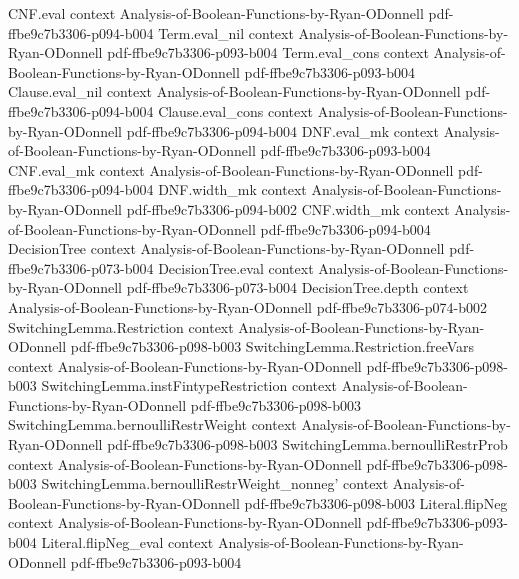 \begin{lemma}
  {CNF.eval}
  {context}
  {Analysis-of-Boolean-Functions-by-Ryan-ODonnell}
  {pdf-ffbe9c7b3306-p094-b004}
\proofstep
  {Term.eval_nil}
  {context}
  {Analysis-of-Boolean-Functions-by-Ryan-ODonnell}
  {pdf-ffbe9c7b3306-p093-b004}
\proofstep
  {Term.eval_cons}
  {context}
  {Analysis-of-Boolean-Functions-by-Ryan-ODonnell}
  {pdf-ffbe9c7b3306-p093-b004}
\proofstep
  {Clause.eval_nil}
  {context}
  {Analysis-of-Boolean-Functions-by-Ryan-ODonnell}
  {pdf-ffbe9c7b3306-p094-b004}
\proofstep
  {Clause.eval_cons}
  {context}
  {Analysis-of-Boolean-Functions-by-Ryan-ODonnell}
  {pdf-ffbe9c7b3306-p094-b004}
\proofstep
  {DNF.eval_mk}
  {context}
  {Analysis-of-Boolean-Functions-by-Ryan-ODonnell}
  {pdf-ffbe9c7b3306-p093-b004}
\proofstep
  {CNF.eval_mk}
  {context}
  {Analysis-of-Boolean-Functions-by-Ryan-ODonnell}
  {pdf-ffbe9c7b3306-p094-b004}
\proofstep
  {DNF.width_mk}
  {context}
  {Analysis-of-Boolean-Functions-by-Ryan-ODonnell}
  {pdf-ffbe9c7b3306-p094-b002}
\proofstep
  {CNF.width_mk}
  {context}
  {Analysis-of-Boolean-Functions-by-Ryan-ODonnell}
  {pdf-ffbe9c7b3306-p094-b004}
\proofstep
  {DecisionTree}
  {context}
  {Analysis-of-Boolean-Functions-by-Ryan-ODonnell}
  {pdf-ffbe9c7b3306-p073-b004}
\proofstep
  {DecisionTree.eval}
  {context}
  {Analysis-of-Boolean-Functions-by-Ryan-ODonnell}
  {pdf-ffbe9c7b3306-p073-b004}
\proofstep
  {DecisionTree.depth}
  {context}
  {Analysis-of-Boolean-Functions-by-Ryan-ODonnell}
  {pdf-ffbe9c7b3306-p074-b002}
\proofstep
  {SwitchingLemma.Restriction}
  {context}
  {Analysis-of-Boolean-Functions-by-Ryan-ODonnell}
  {pdf-ffbe9c7b3306-p098-b003}
\proofstep
  {SwitchingLemma.Restriction.freeVars}
  {context}
  {Analysis-of-Boolean-Functions-by-Ryan-ODonnell}
  {pdf-ffbe9c7b3306-p098-b003}
\proofstep
  {SwitchingLemma.instFintypeRestriction}
  {context}
  {Analysis-of-Boolean-Functions-by-Ryan-ODonnell}
  {pdf-ffbe9c7b3306-p098-b003}
\proofstep
  {SwitchingLemma.bernoulliRestrWeight}
  {context}
  {Analysis-of-Boolean-Functions-by-Ryan-ODonnell}
  {pdf-ffbe9c7b3306-p098-b003}
\proofstep
  {SwitchingLemma.bernoulliRestrProb}
  {context}
  {Analysis-of-Boolean-Functions-by-Ryan-ODonnell}
  {pdf-ffbe9c7b3306-p098-b003}
\proofstep
  {SwitchingLemma.bernoulliRestrWeight_nonneg'}
  {context}
  {Analysis-of-Boolean-Functions-by-Ryan-ODonnell}
  {pdf-ffbe9c7b3306-p098-b003}
\proofstep
  {Literal.flipNeg}
  {context}
  {Analysis-of-Boolean-Functions-by-Ryan-ODonnell}
  {pdf-ffbe9c7b3306-p093-b004}
\proofstep
  {Literal.flipNeg_eval}
  {context}
  {Analysis-of-Boolean-Functions-by-Ryan-ODonnell}
  {pdf-ffbe9c7b3306-p093-b004}
\proofstep

\end{lemma}
